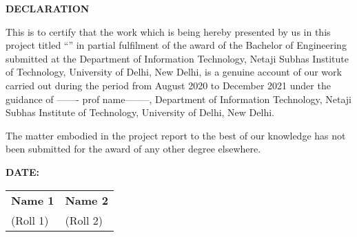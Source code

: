 \thispagestyle{plain}
\begin{center}
\large \large \textbf{DECLARATION}
\end{center}

\vspace{0.3cm}
\fontsize{12pt}{24pt}\selectfont This is to certify that the work which is being hereby presented by us in this project titled “\textbf{\btptitle}” in partial fulfilment of the award of the Bachelor of Engineering submitted at the Department of Information Technology, Netaji Subhas Institute of Technology, University of Delhi, New Delhi, is a genuine account of our work carried out during the period from August 2020 to December 2021 under the guidance of ------- prof name--------, Department of Information Technology, Netaji Subhas Institute of Technology, University of Delhi, New Delhi.

The matter embodied in the project report to the best of our knowledge has not been submitted for the award of any other degree elsewhere.
\vspace{2.0cm}

\textbf{DATE: } \newline \newline \newline \newline

\begin{tabu} to \textwidth { X[l] X[c] }

 \textbf{Name 1} & \textbf{Name 2} \\
 (Roll 1) & (Roll 2) \\
 

\end{tabu}


\newpage